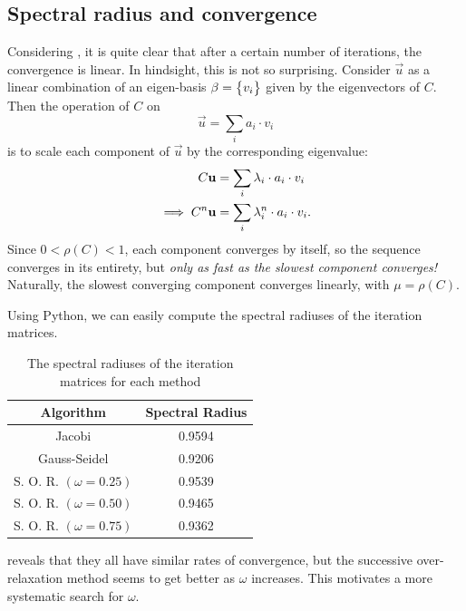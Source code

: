 \documentclass[12pt]{article}
\begin{document}
\begin{multicols}{2}
    \subsection{Spectral radius and convergence}
    Considering ,
    it is quite clear that after a certain number of iterations,
    the convergence is linear.
    In hindsight, this is not so surprising.
    Consider $\vec u$ as a linear combination of an eigen-basis
    $\beta = \Seq{v_i}$
    given by the eigenvectors of $C$.
    Then the operation of $C$ on
    \[
        \vec u = \sum_i a_i \cdot v_i
    \]
    is to scale each component of $\vec u$ by the corresponding eigenvalue:
    \begin{align*}
        C \vec u &= \sum_i \lambda_i \cdot a_i \cdot v_i \\
        \implies C^n \vec u &= \sum_i \lambda_i^n \cdot a_i \cdot v_i
        \text.
    \end{align*}
    Since $0 < \rho(C) < 1$, each component converges by itself,
    so the sequence converges in its entirety, but
    {\em only as fast as the slowest component converges!}
    Naturally, the slowest converging component converges linearly,
    with $\mu = \rho(C)$.

    Using Python, we can easily compute the spectral radiuses
    of the iteration matrices.
    \begin{table}[H]
        \centering
        \caption{The spectral radiuses of the iteration matrices for each method}
        \begin{tabular}{c S[table-format=1.6]}
            \hline\hline
            \bfseries Algorithm & \bfseries Spectral Radius \\
            \hline
            Jacobi                     & 0.9594 \\
            Gauss-Seidel               & 0.9206 \\
            S. O. R. $(\omega = 0.25)$ & 0.9539 \\
            S. O. R. $(\omega = 0.50)$ & 0.9465 \\
            S. O. R. $(\omega = 0.75)$ & 0.9362 \\
            \hline
        \end{tabular}
        \label{table:rhos}
    \end{table}\noindent
     reveals that they all have similar rates of convergence,
    but the successive over-relaxation method seems to get better as $\omega$
    increases.
    This motivates a more systematic search for $\omega$.


\end{multicols}
\end{document}
